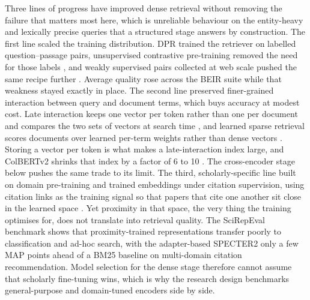 Three lines of progress have improved dense retrieval without removing
the failure that matters most here, which is unreliable behaviour on
the entity-heavy and lexically precise queries that a structured stage
answers by construction.  The first line scaled the training
distribution.  DPR \cite{karpukhin2020dpr} trained the retriever on
labelled question--passage pairs, unsupervised contrastive
pre-training removed the need for those labels
\cite{izacard2022contriever}, and weakly supervised pairs collected at
web scale pushed the same recipe further
\cite{wang2022e5,li2023gte,xiao2023cpack,chen2024bgem3}.  Average
quality rose across the BEIR suite \cite{thakur2021beir} while that
weakness stayed exactly in place.  The second line preserved
finer-grained interaction between query and document terms, which
buys accuracy at modest cost.  Late interaction keeps one vector per
token rather than one per document and compares the two sets of
vectors at search time
\cite{khattab2020colbert,santhanam2022colbertv2}, and learned sparse
retrieval scores documents over learned per-term weights rather than
dense vectors \cite{formal2021splade,formal2022splade}.  Storing a
vector per token is what makes a late-interaction index large, and
ColBERTv2 shrinks that index by a factor of 6 to 10
\cite{santhanam2022colbertv2}.  The cross-encoder stage below pushes
the same trade to its limit.  The third, scholarly-specific line
built on domain pre-training \cite{beltagy2019scibert} and trained
embeddings under citation supervision, using citation links as the
training signal so that papers that cite one another sit close in the
learned space \cite{cohan2020specter,ostendorff2022scincl}.  Yet proximity in that space, the very thing the training optimises for, does not translate into retrieval quality.  The SciRepEval benchmark
\cite{singh2023scirepeval} shows that proximity-trained representations
transfer poorly to classification and ad-hoc search, with the
adapter-based SPECTER2 only a few MAP points ahead of a BM25 baseline
on multi-domain citation recommendation.  Model selection for the dense
stage therefore cannot assume that scholarly fine-tuning wins, which is
why the research design benchmarks general-purpose and domain-tuned
encoders side by side.

